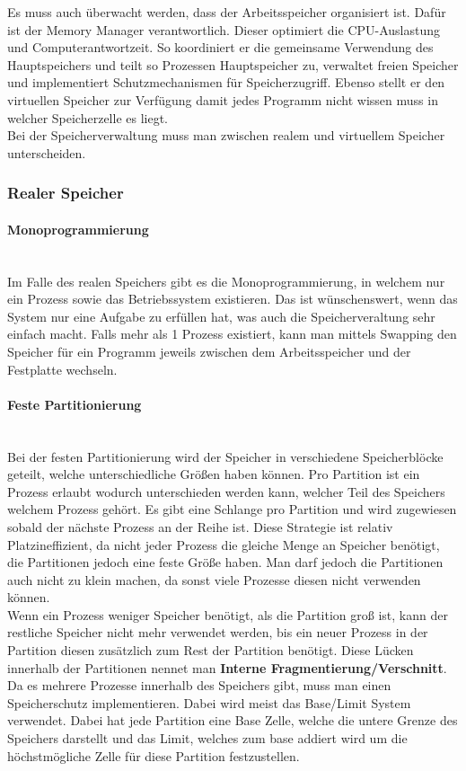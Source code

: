 \documentclass{article}
\newcommand{\paragraphlb}[1]{\paragraph{#1}\mbox{}\\}
\begin{document}
	Es muss auch überwacht werden, dass der Arbeitsspeicher organisiert ist. Dafür ist der Memory Manager verantwortlich. Dieser optimiert die CPU-Auslastung und Computerantwortzeit. So koordiniert er die gemeinsame Verwendung des Hauptspeichers und teilt so Prozessen Hauptspeicher zu, verwaltet freien Speicher und implementiert Schutzmechanismen für Speicherzugriff. Ebenso stellt er den virtuellen Speicher zur Verfügung damit jedes Programm nicht wissen muss in welcher Speicherzelle es liegt.\\
	Bei der Speicherverwaltung muss man zwischen realem und virtuellem Speicher unterscheiden. 
	\subsubsection{Realer Speicher}
	\paragraphlb{Monoprogrammierung}
	Im Falle des realen Speichers gibt es die Monoprogrammierung, in welchem nur ein Prozess sowie das Betriebssystem existieren. Das ist wünschenswert, wenn das System nur eine Aufgabe zu erfüllen hat, was auch die Speicherveraltung sehr einfach macht. Falls mehr als 1 Prozess existiert, kann man mittels Swapping den Speicher für ein Programm jeweils zwischen dem Arbeitsspeicher und der Festplatte wechseln.
	\paragraphlb{Feste Partitionierung}
	Bei der festen Partitionierung wird der Speicher in verschiedene Speicherblöcke geteilt, welche unterschiedliche Größen haben können. Pro Partition ist ein Prozess erlaubt wodurch unterschieden werden kann, welcher Teil des Speichers welchem Prozess gehört. Es gibt eine Schlange pro Partition und wird zugewiesen sobald der nächste Prozess an der Reihe ist. Diese Strategie ist relativ Platzineffizient, da nicht jeder Prozess die gleiche Menge an Speicher benötigt, die Partitionen jedoch eine feste Größe haben. Man darf jedoch die Partitionen auch nicht zu klein machen, da sonst viele Prozesse diesen nicht verwenden können.\\
	Wenn ein Prozess weniger Speicher benötigt, als die Partition groß ist, kann der restliche Speicher nicht mehr verwendet werden, bis ein neuer Prozess in der Partition diesen zusätzlich zum Rest der Partition benötigt. Diese Lücken innerhalb der Partitionen nennet man \textbf{Interne Fragmentierung/Verschnitt}. \\
	Da es mehrere Prozesse innerhalb des Speichers gibt, muss man einen Speicherschutz implementieren. Dabei wird meist das Base/Limit System verwendet. Dabei hat jede Partition eine Base Zelle, welche die untere Grenze des Speichers darstellt und das Limit, welches zum base addiert wird um die höchstmögliche Zelle für diese Partition festzustellen.
\end{document}
